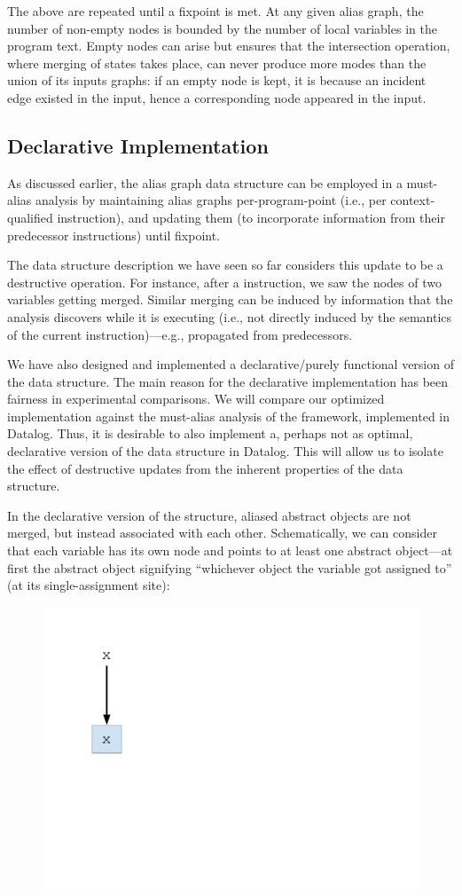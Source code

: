The above are repeated until a fixpoint is met. At any given alias graph, the number of non-empty nodes is bounded by the number of local variables in the program text. Empty nodes can arise but  ensures that the intersection operation, where merging of states takes place, can never produce more modes than the union of its inputs graphs: if an empty node is kept, it is because an incident edge existed in the input, hence a corresponding node appeared in the input.


\subsection{Declarative Implementation}

As discussed earlier, the alias graph data structure can be employed in a must-alias analysis by maintaining alias graphs per-program-point (i.e., per context-qualified instruction), and updating them (to incorporate information from their predecessor instructions) until fixpoint.

The data structure description we have seen so far considers this update to be a destructive operation. For instance, after a  instruction, we saw the nodes of two variables getting merged. Similar merging can be induced by information that the analysis discovers while it is executing (i.e., not directly induced by the semantics of the current instruction)---e.g., propagated from predecessors.

We have also designed and implemented a declarative/purely functional version of the data structure. The main reason for the declarative implementation has been fairness in experimental comparisons. We will compare our optimized implementation against the must-alias analysis of the \doop{} framework, implemented in Datalog. Thus, it is desirable to also implement a, perhaps not as optimal, declarative version of the data structure in Datalog. This will allow us to isolate the effect of destructive updates from the inherent properties of the data structure.

In the declarative version of the structure, aliased abstract objects are not merged, but instead associated with each other. Schematically, we can consider that each variable has its own node and points to at least one abstract object---at first the abstract object signifying ``whichever object the variable got assigned to'' (at its single-assignment site):

\begin{figure}[h]
\centering
\includegraphics[trim={25mm 90mm 190mm 25mm},clip,width=0.15\linewidth]{assets/must-data/decl-alias-graph0.pdf}
\end{figure}

